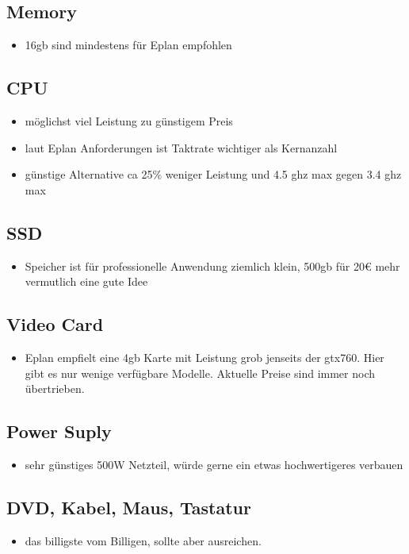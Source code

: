 \documentclass[11pt]{article}
\begin{document}
\subsection{Memory}
\label{sec:org11d2f91}
\begin{itemize}
\item 16gb sind mindestens für Eplan empfohlen
\end{itemize}
\subsection{CPU}
\label{sec:orgd3dc239}
\begin{itemize}
\item möglichst viel Leistung zu günstigem Preis
\item laut Eplan Anforderungen ist Taktrate wichtiger als Kernanzahl
\item günstige Alternative ca 25\% weniger Leistung und 4.5 ghz max gegen 3.4 ghz max
\end{itemize}
\subsection{SSD}
\label{sec:org9db70ba}
\begin{itemize}
\item Speicher ist für professionelle Anwendung ziemlich klein, 500gb für 20€ mehr vermutlich eine gute Idee
\end{itemize}
\subsection{Video Card}
\label{sec:org5402924}
\begin{itemize}
\item Eplan empfielt eine 4gb Karte mit Leistung grob jenseits der gtx760. Hier gibt es nur wenige verfügbare Modelle. Aktuelle Preise sind immer noch übertrieben.
\end{itemize}
\subsection{Power Suply}
\label{sec:org77ae4d0}
\begin{itemize}
\item sehr günstiges 500W Netzteil, würde gerne ein etwas hochwertigeres verbauen
\end{itemize}

\subsection{DVD, Kabel, Maus, Tastatur}
\label{sec:org2667546}
\begin{itemize}
\item das billigste vom Billigen, sollte aber ausreichen.
\end{itemize}
\end{document}
